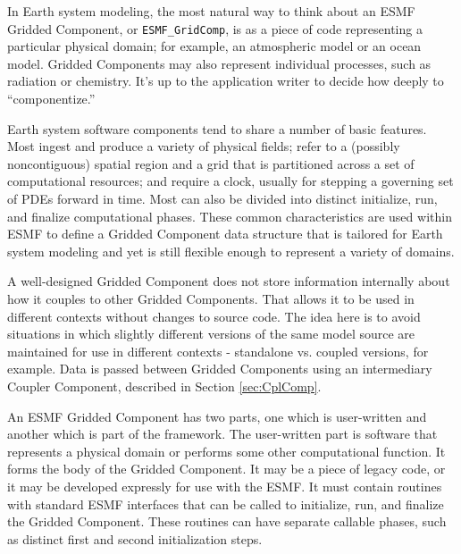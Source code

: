 %


In Earth system modeling, the most natural way to think about an ESMF 
Gridded Component, or {\tt ESMF\_GridComp}, is as a piece of code 
representing a particular physical domain; for example, an atmospheric 
model or an ocean model.  Gridded Components may also represent individual
processes, such as radiation or chemistry.  It's up to the application
writer to decide how deeply to ``componentize.''

Earth system software components tend to share a number of basic 
features.  Most ingest and produce a variety of physical fields; refer to 
a (possibly noncontiguous) spatial region and a grid that is 
partitioned across a set of computational resources; and require 
a clock, usually for stepping a governing set of PDEs forward in time.  
Most can also be divided into distinct initialize, run, and finalize 
computational phases.  These common characteristics are used 
within ESMF to define a Gridded Component data structure that 
is tailored for Earth system modeling and yet is still flexible
enough to represent a variety of domains.

A well-designed Gridded Component does not store information 
internally about how it couples to other Gridded Components.  That
allows it to be used in different contexts without changes to source
code.  The idea here is to avoid situations in which slightly
different versions of the same model source are maintained for use in 
different contexts - standalone vs. coupled versions, for example.
Data is passed between Gridded Components using an intermediary 
Coupler Component, described in Section \ref{sec:CplComp}.

An ESMF Gridded Component has two parts, one which is user-written
and another which is part of the framework.  The user-written
part is software that represents a physical domain or performs some
other computational function.  It forms the body of the Gridded 
Component.  It may be a piece of legacy code, or it may be developed 
expressly for use with the ESMF.  It must contain routines with
standard ESMF interfaces that can be called to initialize, run, and
finalize the Gridded Component.  These routines can have separate 
callable phases, such as distinct first and second initialization steps.

